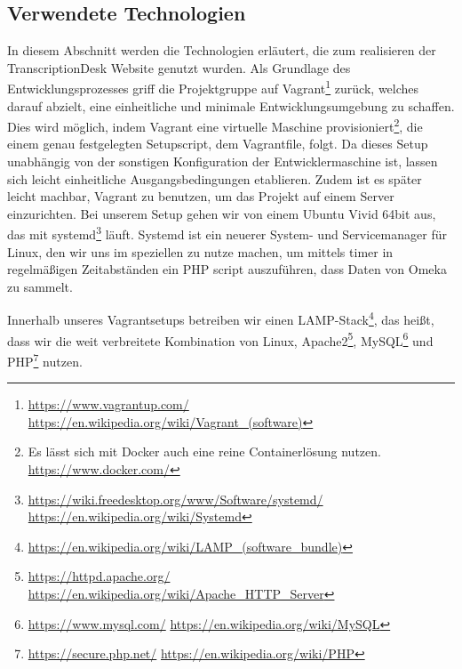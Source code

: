 \documentclass{article}
\begin{document}
\subsection{Verwendete Technologien}
In diesem Abschnitt werden die Technologien erläutert,
die zum realisieren der TranscriptionDesk Website genutzt wurden.
Als Grundlage des Entwicklungsprozesses griff die Projektgruppe auf Vagrant\footnote{
    \url{https://www.vagrantup.com/}\\
    \url{https://en.wikipedia.org/wiki/Vagrant_(software)}}
zurück, welches darauf abzielt, eine einheitliche und minimale Entwicklungsumgebung zu schaffen.
Dies wird möglich, indem Vagrant eine virtuelle Maschine provisioniert\footnote{
    Es lässt sich mit Docker auch eine reine Containerlösung nutzen.\\
    \url{https://www.docker.com/}},
die einem genau festgelegten Setupscript, dem Vagrantfile, folgt.
Da dieses Setup unabhängig von der sonstigen Konfiguration der Entwicklermaschine ist,
lassen sich leicht einheitliche Ausgangsbedingungen etablieren.
Zudem ist es später leicht machbar, Vagrant zu benutzen,
um das Projekt auf einem Server einzurichten.
Bei unserem Setup gehen wir von einem Ubuntu Vivid 64bit aus,
das mit systemd\footnote{
    \url{https://wiki.freedesktop.org/www/Software/systemd/}\\
    \url{https://en.wikipedia.org/wiki/Systemd}}
läuft. Systemd ist ein neuerer System- und Servicemanager für Linux,
den wir uns im speziellen zu nutze machen,
um mittels timer in regelmäßigen Zeitabständen
ein PHP script auszuführen,
dass Daten von Omeka zu sammelt.%

Innerhalb unseres Vagrantsetups betreiben wir einen LAMP-Stack\footnote{\url{https://en.wikipedia.org/wiki/LAMP_(software_bundle)}},
das heißt, dass wir die weit verbreitete Kombination von Linux, Apache2\footnote{
    \url{https://httpd.apache.org/}
    \url{https://en.wikipedia.org/wiki/Apache_HTTP_Server}}, MySQL\footnote{
    \url{https://www.mysql.com/}
    \url{https://en.wikipedia.org/wiki/MySQL}} und PHP\footnote{
    \url{https://secure.php.net/}
    \url{https://en.wikipedia.org/wiki/PHP}} nutzen.
\end{document}
